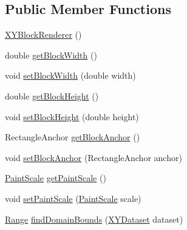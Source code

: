 \subsection*{Public Member Functions}
\begin{DoxyCompactItemize}
\item 
\mbox{\hyperlink{classorg_1_1jfree_1_1chart_1_1renderer_1_1xy_1_1_x_y_block_renderer_a037e9244d668615803cc0da6a7822dcf}{X\+Y\+Block\+Renderer}} ()
\item 
double \mbox{\hyperlink{classorg_1_1jfree_1_1chart_1_1renderer_1_1xy_1_1_x_y_block_renderer_acdc4373b03cf11a77d5ded9da046838a}{get\+Block\+Width}} ()
\item 
void \mbox{\hyperlink{classorg_1_1jfree_1_1chart_1_1renderer_1_1xy_1_1_x_y_block_renderer_a83c689e43e5824dacae3ad92c8f376b1}{set\+Block\+Width}} (double width)
\item 
double \mbox{\hyperlink{classorg_1_1jfree_1_1chart_1_1renderer_1_1xy_1_1_x_y_block_renderer_aac37f41e42556989584d8994e89833e6}{get\+Block\+Height}} ()
\item 
void \mbox{\hyperlink{classorg_1_1jfree_1_1chart_1_1renderer_1_1xy_1_1_x_y_block_renderer_aae2bb132aaced9d2a933b9dd9b981a0c}{set\+Block\+Height}} (double height)
\item 
Rectangle\+Anchor \mbox{\hyperlink{classorg_1_1jfree_1_1chart_1_1renderer_1_1xy_1_1_x_y_block_renderer_a7f7b501fa081e927d3156cb126715b2a}{get\+Block\+Anchor}} ()
\item 
void \mbox{\hyperlink{classorg_1_1jfree_1_1chart_1_1renderer_1_1xy_1_1_x_y_block_renderer_abec4bea582737e1d78ac51ddadc9b095}{set\+Block\+Anchor}} (Rectangle\+Anchor anchor)
\item 
\mbox{\hyperlink{interfaceorg_1_1jfree_1_1chart_1_1renderer_1_1_paint_scale}{Paint\+Scale}} \mbox{\hyperlink{classorg_1_1jfree_1_1chart_1_1renderer_1_1xy_1_1_x_y_block_renderer_ab9b579727809c4213cce490cbeed1d94}{get\+Paint\+Scale}} ()
\item 
void \mbox{\hyperlink{classorg_1_1jfree_1_1chart_1_1renderer_1_1xy_1_1_x_y_block_renderer_afd5b5bf65eeda72c806beab182dfbf07}{set\+Paint\+Scale}} (\mbox{\hyperlink{interfaceorg_1_1jfree_1_1chart_1_1renderer_1_1_paint_scale}{Paint\+Scale}} scale)
\item 
\mbox{\hyperlink{classorg_1_1jfree_1_1data_1_1_range}{Range}} \mbox{\hyperlink{classorg_1_1jfree_1_1chart_1_1renderer_1_1xy_1_1_x_y_block_renderer_a06dee596697cffdf1e23acb81a2ecd5e}{find\+Domain\+Bounds}} (\mbox{\hyperlink{interfaceorg_1_1jfree_1_1data_1_1xy_1_1_x_y_dataset}{X\+Y\+Dataset}} dataset)

\end{DoxyCompactItemize}
